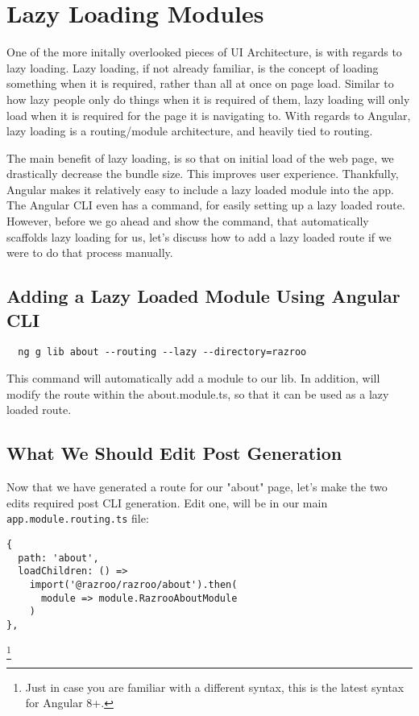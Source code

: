 
\chapter{ Lazy Loading Modules }
One of the more initally overlooked pieces of UI Architecture, is with regards to 
lazy loading. Lazy loading, if not already familiar, is the concept of loading
something when it is required, rather than all at once on page load. Similar to 
how lazy people only do things when it is required of them, lazy loading will 
only load when it is required for the page it is navigating to. With regards to Angular,
lazy loading is a routing/module architecture, and heavily tied to routing. 

The main benefit of lazy loading, is so that on initial load of the web page, we
drastically decrease the bundle size. This improves user experience. Thankfully, Angular 
makes it relatively easy to include a lazy loaded module into the app. The Angular CLI 
even has a command, for easily setting up a lazy loaded route. However, before we go 
ahead and show the command, that automatically scaffolds lazy loading for us, let's discuss
how to add a lazy loaded route if we were to do that process manually. 

\section{Adding a Lazy Loaded Module Using Angular CLI}
\begin{verbatim}
  ng g lib about --routing --lazy --directory=razroo
\end{verbatim}

This command will automatically add a module to our lib. In addition, will 
modify the route within the about.module.ts, so that it can be used as a
lazy loaded route. 

\section{What We Should Edit Post Generation}
Now that we have generated a route for our "about" page, let's make the two 
edits required post CLI generation. Edit one, will be in our main 
\lstinline{app.module.routing.ts} file:
\begin{lstlisting}
{
  path: 'about',
  loadChildren: () =>  
    import('@razroo/razroo/about').then(
      module => module.RazrooAboutModule
    )
},
\end{lstlisting}
\footnote{Just in case you are familiar with a different syntax, this is the 
latest syntax for Angular 8+.}

